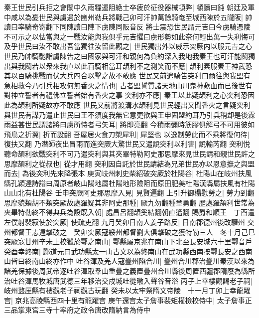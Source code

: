 秦王世民引兵拒之會關中久雨糧運阻絶士卒疲於征役器械頓弊|{
	頓讀曰鈍}
朝廷及軍中咸以為憂世民與虜遇於豳州勒兵將戰己卯可汗帥萬餘騎奄至城西陳於五隴阪|{
	帥讀曰率騎奇寄翻下同陳讀曰陣下虜陳同阪音反}
將士震恐世民謂元吉曰今虜騎憑陵不可示之以怯當與之一戰汝能與我俱乎元吉懼曰虜形勢如此奈何輕出萬一失利悔可及乎世民曰汝不敢出吾當獨往汝留此觀之|{
	世民獨出外以威示突厥内以服元吉之心}
世民乃帥騎馳詣虜陳吿之曰國家與可汗和親何為負約深入我地我秦王也可汗能鬭獨出與我鬭若以衆來我直以此百騎相當耳頡利不之測笑而不應|{
	頡利素服秦王神武恐其以百騎挑戰而伏大兵四合以擊之故不敢應}
世民又前遣騎吿突利曰爾往與我盟有急相救今乃引兵相攻何無香火之情也|{
	古者盟誓質諸天地山川鬼神歃血而已後世有對神立誓者有禮佛立誓者始有香火之事}
突利亦不應|{
	秦王以此疑頡利之心突利恐因此為頡利所疑故亦不敢應}
世民又前將渡溝水頡利見世民輕出又聞香火之言疑突利與世民有謀乃遣止世民曰王不須度我無它意更欲與王申固盟約耳乃引兵稍却是後霖雨益甚世民謂諸將曰虜所恃者弓矢耳|{
	將即亮翻}
今積雨彌時筋膠俱解弓不可用彼如飛鳥之折翼|{
	折而設翻}
吾屋居火食刀槊犀利|{
	犀堅也}
以逸制勞此而不乘將復何待|{
	復扶又翻}
乃潛師夜出冒雨而進突厥大驚世民又遣說突利以利害|{
	說輸芮翻}
突利悦聽命頡利欲戰突利不可乃遣突利與其夾畢特勒阿史那思摩來見世民請和親世民許之思摩頡利之從叔也|{
	從才用翻}
突利因自託於世民請結為兄弟世民亦以恩意撫之與盟而去|{
	為後突利先來降張本}
庚寅岐州刺史柴紹破突厥於杜陽谷|{
	杜陽山在岐州扶風縣孔穎達詩譜曰周原者岐山陽地屬杜陽地形險阻而原田肥美杜陽漢縣屬扶風有杜陽山山北有杜陽谷}
壬申突厥阿史那思摩入見|{
	見賢遍翻}
上引升御榻慰勞之|{
	勞力到翻}
思摩貌類胡不類突厥故處羅疑其非阿史那種|{
	厥九勿翻種章勇翻}
歷處羅頡利世常為夾畢特勒終不得典兵為設既入朝|{
	處昌呂翻頡奚結翻朝直遙翻}
賜爵和順王　丁酉遣左僕射裴寂使於突厥|{
	使疏吏翻}
九月癸卯日南人姜子路反|{
	日南郡德州後改驩州}
交州都督王志遠擊破之　癸卯突厥寇綏州都督劉大俱擊破之獲特勒三人　冬十月己巳突厥寇甘州辛未上校獵於鄠之南山|{
	鄠縣屬京兆在南山下北至長安城六十里鄠音戶}
癸酉幸終南|{
	酈道元曰武功縣太一山古文以為終南山在武功縣西南按鄠長安之西南山皆曰終南山終亦作中}
吐谷渾及羌人寇疊州陷合川|{
	疊州合川郡治疊川秦漢以來為諸羌保據後周武帝逐吐谷渾取羣山重疊之義置疊州合川縣後周置西疆郡隋廢為縣所治吐谷渾馬牧城唐武德三年移治交戍城吐從暾入聲谷音浴}
丙子上幸樓觀謁老子祠|{
	岐州盩厔縣有樓觀老子祠觀古玩翻}
癸未以太牢祭隋文帝陵　十一月丁卯上幸龍躍宫|{
	京兆高陵縣西四十里有龍躍宫}
庚午還宫太子詹事裴矩權檢校侍中|{
	太子詹事正三品掌東宫三寺十率府之政令唐改隋納言為侍中}


